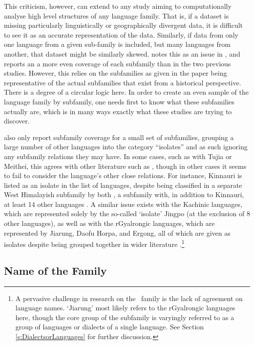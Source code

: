 This criticism, however, can extend to any study aiming to computationally analyse high level structures of any language family. That is, if a dataset is missing particularly linguistically or geographically divergent data, it is difficult to see it as an accurate representation of the data. Similarly, if data from only one language from a given sub-family is included, but many languages from another, that dataset might be similarly skewed.  notes this as an issue in , and reports an a more even coverage of each subfamily than in the two previous studies. However, this relies on the subfamilies as given in the paper being representative of the actual subfamilies that exist from a historical perspective. There is a degree of a circular logic here. In order to create an even sample of the language family by subfamily, one needs first to know what these subfamilies actually are, which is in many ways exactly what these studies are trying to discover.

 also only report subfamily coverage for a small set of subfamilies, grouping a large number of other languages into the category ``isolates'' and as such ignoring any subfamily relations they may have. In some cases, such as with Tujia or Meithei, this agrees with other literature such as , though in other cases it seems to fail to consider the language's other close relations. For instance, Kinnauri is listed as an isolate in the list of languages, despite being classified in a separate West Himalayish subfamily by both , a subfamily with, in addition to Kinnauri, at least 14 other languages \cite{glottolog}. A similar issue exists with the Kachinic languages, which are represented solely by the so-called `isolate' Jingpo (at the exclusion of 8 other languages), as well as with the rGyalrongic languages, which are represented by Jiarung, Daofu Horpa, and Ergong, all of which are given as isolates despite being grouped together in wider literature \cites{Honkasalo2019}{Gates2021}.\footnote{A pervasive challenge in research on the \lfam\ family is the lack of agreement on language names. `Jiarung' most likely refers to the rGyalrongic languages here, though the core group of the subfamily is varyingly referred to as a group of languages or dialects of a single language. See Section \ref{s:DialectsorLanguages} for further discussion.}

\subsection{Name of the Family}

